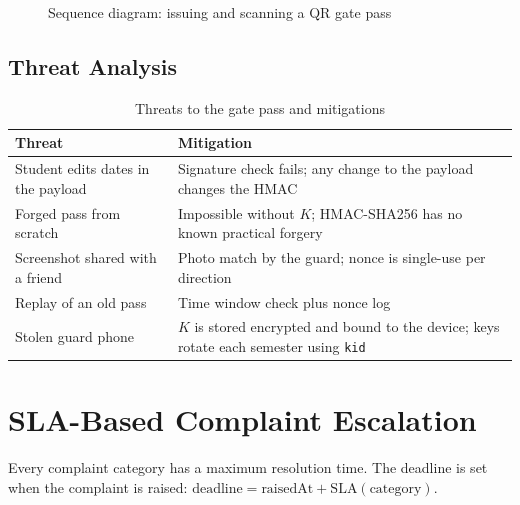 \documentclass[11pt,a4paper]{report}
\begin{document}
\begin{figure}[!htbp]
\centering
{}
\caption{Sequence diagram: issuing and scanning a QR gate pass}\label{fig:seqqr}
\end{figure}

\subsection{Threat Analysis}
\begin{table}[H]
\centering\small
\caption{Threats to the gate pass and mitigations}\label{tab:qrthreat}
\begin{tabularx}{\textwidth}{lL}
\toprule
\textbf{Threat} & \textbf{Mitigation}\\
\midrule
Student edits dates in the payload & Signature check fails; any change to the payload changes the HMAC\\
Forged pass from scratch & Impossible without $K$; HMAC-SHA256 has no known practical forgery\\
Screenshot shared with a friend & Photo match by the guard; nonce is single-use per direction\\
Replay of an old pass & Time window check plus nonce log\\
Stolen guard phone & $K$ is stored encrypted and bound to the device; keys rotate each semester using \texttt{kid}\\
\bottomrule
\end{tabularx}
\end{table}

\section{SLA-Based Complaint Escalation}
Every complaint category has a maximum resolution time. The deadline is set when the complaint is raised: $\text{deadline} = \text{raisedAt} + \text{SLA}(\text{category})$.
\end{document}
